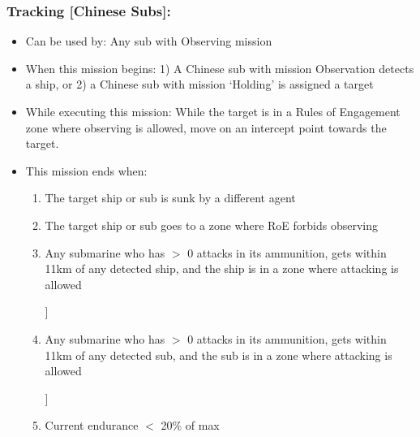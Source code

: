 \documentclass{article}
\begin{document}
    \subsubsection{Tracking [Chinese Subs]:}
        \begin{itemize}
            \item{Can be used by:} Any sub with Observing mission
            \item{When this mission begins:} 1) A Chinese sub with mission Observation detects a ship, or 2) a Chinese sub with mission `Holding' is assigned a target
            \item{While executing this mission:} While the target is in a Rules of Engagement zone where observing is allowed, move on an intercept point towards the target.
            \item{This mission ends when:} 
            \begin{enumerate}[label=\arabic*)]
                \item The target ship or sub is sunk by a different agent \par
                [hunter resumes player-assigned mission]
                \item The target ship or sub goes to a zone where RoE forbids observing \par
                [hunter resumes player-assigned mission]
                \item Any submarine who has $>$ 0 attacks in its ammunition, gets within 11km of any detected ship, and the ship is in a zone where attacking is allowed \par
                [hunter begins Attacking Ship - Non-Deckgun [Chinese Subs]]
                \item Any submarine who has $>$ 0 attacks in its ammunition, gets within 11km of any detected sub, and the sub is in a zone where attacking is allowed \par
                [hunter begins Attacking Submarine [Chinese Subs]]
                \item Current endurance $<$ 20\% of max \par
                [hunter returns to base]
            \end{enumerate}
        \end{itemize}
\end{document}
